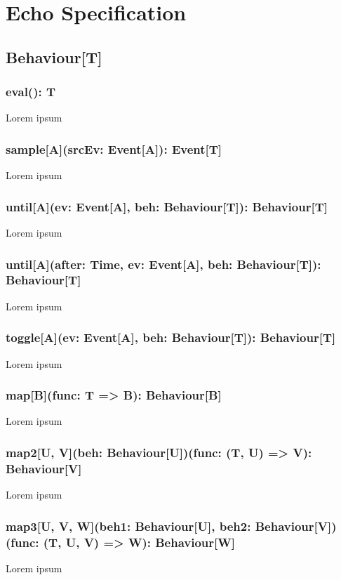 \chapter{Echo Specification}

  \section*{Behaviour[T]}
    \subsection*{eval(): T}
      Lorem ipsum
    
    \subsection*{sample[A](srcEv: Event[A]): Event[T]}
      Lorem ipsum
    
    \subsection*{until[A](ev: Event[A], beh: Behaviour[T]): Behaviour[T]}
      Lorem ipsum
      
    \subsection*{until[A](after: Time, ev: Event[A], beh: Behaviour[T]): Behaviour[T]}
      Lorem ipsum
      
    \subsection*{toggle[A](ev: Event[A], beh: Behaviour[T]): Behaviour[T]}
      Lorem ipsum
      
    \subsection*{map[B](func: T => B): Behaviour[B]}
      Lorem ipsum
      
    \subsection*{map2[U, V](beh: Behaviour[U])(func: (T, U) => V): Behaviour[V]}
      Lorem ipsum

    \subsection*{map3[U, V, W](beh1: Behaviour[U], beh2: Behaviour[V])(func: (T, U, V) => W): Behaviour[W]}
      Lorem ipsum
      
